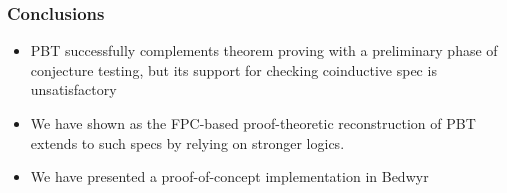 \documentclass{beamer}
\newenvironment{myslide}[1]
    {\begin{frame}\frametitle{#1}}
    {\end{frame}}
\begin{document}
  \begin{myslide}{Conclusions}
  \begin{itemize}
  \item PBT successfully
    complements theorem proving with a preliminary phase of conjecture
    testing, but its support for checking coinductive spec is unsatisfactory

\item We have shown as the FPC-based proof-theoretic reconstruction of
  PBT extends to such specs by relying on stronger logics.

   \item We have presented a proof-of-concept implementation in Bedwyr
  \end{itemize}
  
\end{myslide}
\end{document}

